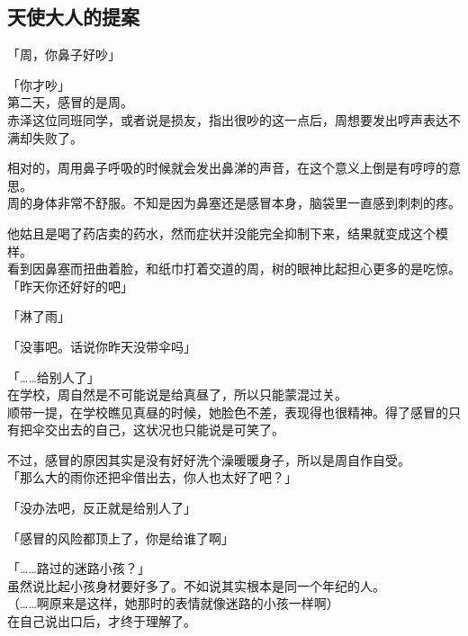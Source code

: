 \subsection{天使大人的提案}

「周，你鼻子好吵」

「你才吵」\\

第二天，感冒的是周。\\

赤泽这位同班同学，或者说是损友，指出很吵的这一点后，周想要发出哼声表达不满却失败了。

相对的，周用鼻子呼吸的时候就会发出鼻涕的声音，在这个意义上倒是有哼哼的意思。\\

周的身体非常不舒服。不知是因为鼻塞还是感冒本身，脑袋里一直感到刺刺的疼。

他姑且是喝了药店卖的药水，然而症状并没能完全抑制下来，结果就变成这个模样。\\

看到因鼻塞而扭曲着脸，和纸巾打着交道的周，树的眼神比起担心更多的是吃惊。\\

「昨天你还好好的吧」

「淋了雨」

「没事吧。话说你昨天没带伞吗」

「……给别人了」\\

在学校，周自然是不可能说是给真昼了，所以只能蒙混过关。\\

顺带一提，在学校瞧见真昼的时候，她脸色不差，表现得也很精神。得了感冒的只有把伞交出去的自己，这状况也只能说是可笑了。

不过，感冒的原因其实是没有好好洗个澡暖暖身子，所以是周自作自受。\\

「那么大的雨你还把伞借出去，你人也太好了吧？」

「没办法吧，反正就是给别人了」

「感冒的风险都顶上了，你是给谁了啊」

「……路过的迷路小孩？」\\

虽然说比起小孩身材要好多了。不如说其实根本是同一个年纪的人。\\

（……啊原来是这样，她那时的表情就像迷路的小孩一样啊）\\

在自己说出口后，才终于理解了。

